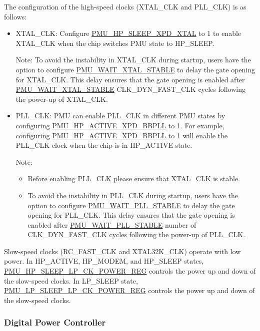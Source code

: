 \documentclass[main\_\_EN.tex]{subfiles}
\begin{document}
The configuration of the high-speed clocks (XTAL\_CLK and PLL\_CLK) is as follows:

\begin{itemize}
    \item XTAL\_CLK: Configure \hyperref[fielddesc:PMUHPSLEEPXPDXTAL]{PMU\_HP\_SLEEP\_XPD\_XTAL} to 1 to enable XTAL\_CLK when the chip switches PMU state to HP\_SLEEP.

    Note: To avoid the instability in XTAL\_CLK during startup, users have the option to configure \hyperref[fielddesc:PMUWAITXTALSTABLE]{PMU\_WAIT\_XTAL\_STABLE} to delay the gate opening for XTAL\_CLK. This delay ensures that the gate opening is enabled after \hyperref[fielddesc:PMUWAITXTALSTABLE]{PMU\_WAIT\_XTAL\_STABLE} CLK\_DYN\_FAST\_CLK cycles following the power-up of XTAL\_CLK.

    \item PLL\_CLK: PMU can enable PLL\_CLK in different PMU states by configuring \hyperref[fielddesc:PMUHPACTIVEXPDBBPLL]{PMU\_HP\_ACTIVE\_XPD\_BBPLL} to 1. For example, configuring \hyperref[fielddesc:PMUHPACTIVEXPDBBPLL]{PMU\_HP\_ACTIVE\_XPD\_BBPLL} to 1 will enable the PLL\_CLK clock when the chip is in HP\_ACTIVE state.

    Note:
    \begin{itemize}
        \item Before enabling PLL\_CLK please ensure that XTAL\_CLK is stable.
        \item To avoid the instability in PLL\_CLK during startup, users have the option to configure \hyperref[fielddesc:PMUWAITPLLSTABLE]{PMU\_WAIT\_PLL\_STABLE} to delay the gate opening for PLL\_CLK. This delay ensures that the gate opening is enabled after \hyperref[fielddesc:PMUWAITPLLSTABLE]{PMU\_WAIT\_PLL\_STABLE} number of CLK\_DYN\_FAST\_CLK cycles following the power-up of PLL\_CLK.
    \end{itemize}
\end{itemize}

Slow-speed clocks (RC\_FAST\_CLK and XTAL32K\_CLK) operate with low power. In HP\_ACTIVE, HP\_MODEM, and HP\_SLEEP states, \hyperref[regdesc:PMUHPSLEEPLPCKPOWERREG]{PMU\_HP\_SLEEP\_LP\_CK\_POWER\_REG} controls the power up and down of the slow-speed clocks. In LP\_SLEEP state, \hyperref[regdesc:PMULPSLEEPLPCKPOWERREG]{PMU\_LP\_SLEEP\_LP\_CK\_POWER\_REG} controls the power up and down of the slow-speed clocks.

\subsubsection{Digital Power Controller}
\end{document}
